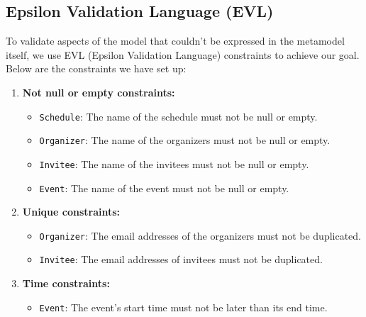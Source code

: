 \documentclass[12pt, letterpaper, twoside]{article}
\begin{document}
\subsection{Epsilon Validation Language (EVL)}
To validate aspects of the model that couldn't be expressed in the metamodel itself, we use EVL (Epsilon Validation Language) constraints to achieve our goal. Below are the constraints we have set up:
\begin{enumerate}
    \item \textbf{Not null or empty constraints:}
    \begin{itemize}
        \item \texttt{Schedule}: The name of the schedule must not be null or empty.
        \item \texttt{Organizer}: The name of the organizers must not be null or empty.
        \item \texttt{Invitee}: The name of the invitees must not be null or empty.
        \item \texttt{Event}: The name of the event must not be null or empty.
    \end{itemize}
    \item \textbf{Unique constraints:}
    \begin{itemize}
        \item \texttt{Organizer}: The email addresses of the organizers must not be duplicated.
        \item \texttt{Invitee}: The email addresses of invitees must not be duplicated.
    \end{itemize}
    \item \textbf{Time constraints:}
    \begin{itemize}
        \item \texttt{Event}: The event's start time must not be later than its end time.
    \end{itemize}
\end{enumerate}
\end{document}
